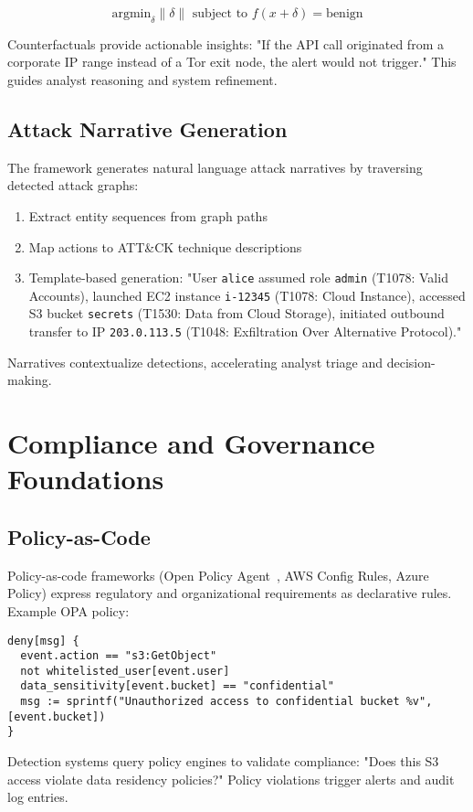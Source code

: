 $$\text{argmin}_{\delta} \|\delta\| \text{ subject to } f(x + \delta) = \text{benign}$$

Counterfactuals provide actionable insights: "If the API call originated from a corporate IP range instead of a Tor exit node, the alert would not trigger." This guides analyst reasoning and system refinement.

\subsection{Attack Narrative Generation}
The framework generates natural language attack narratives by traversing detected attack graphs:
\begin{enumerate}
    \item Extract entity sequences from graph paths
    \item Map actions to ATT\&CK technique descriptions
    \item Template-based generation: "User \texttt{alice} assumed role \texttt{admin} (T1078: Valid Accounts), launched EC2 instance \texttt{i-12345} (T1078: Cloud Instance), accessed S3 bucket \texttt{secrets} (T1530: Data from Cloud Storage), initiated outbound transfer to IP \texttt{203.0.113.5} (T1048: Exfiltration Over Alternative Protocol)."
\end{enumerate}

Narratives contextualize detections, accelerating analyst triage and decision-making.

\section{Compliance and Governance Foundations}\label{sec:theory-compliance}
\subsection{Policy-as-Code}
Policy-as-code frameworks (Open Policy Agent~\cite{openpolicyagent2023}, AWS Config Rules, Azure Policy) express regulatory and organizational requirements as declarative rules. Example OPA policy:

\begin{verbatim}
deny[msg] {
  event.action == "s3:GetObject"
  not whitelisted_user[event.user]
  data_sensitivity[event.bucket] == "confidential"
  msg := sprintf("Unauthorized access to confidential bucket %v", [event.bucket])
}
\end{verbatim}

Detection systems query policy engines to validate compliance: "Does this S3 access violate data residency policies?" Policy violations trigger alerts and audit log entries.

